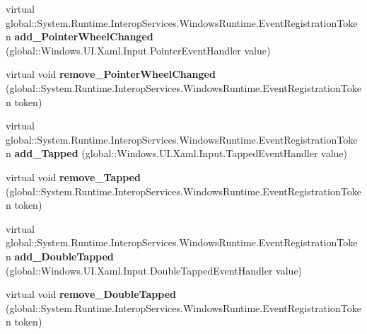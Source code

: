 \begin{DoxyCompactItemize}
\mbox{\label{class_windows_1_1_u_i_1_1_xaml_1_1_u_i_element_a789daf5519a2893ca5d46308010e2bae}} 
virtual global\+::\+System.\+Runtime.\+Interop\+Services.\+Windows\+Runtime.\+Event\+Registration\+Token {\bfseries add\+\_\+\+Pointer\+Wheel\+Changed} (global\+::\+Windows.\+U\+I.\+Xaml.\+Input.\+Pointer\+Event\+Handler value)
\item 
\mbox{\label{class_windows_1_1_u_i_1_1_xaml_1_1_u_i_element_ac3ff4695ca9eb06d618cbf67509cf594}} 
virtual void {\bfseries remove\+\_\+\+Pointer\+Wheel\+Changed} (global\+::\+System.\+Runtime.\+Interop\+Services.\+Windows\+Runtime.\+Event\+Registration\+Token token)
\item 
\mbox{\label{class_windows_1_1_u_i_1_1_xaml_1_1_u_i_element_a424707fb793f3cb0d3d9c1a1d642c7e1}} 
virtual global\+::\+System.\+Runtime.\+Interop\+Services.\+Windows\+Runtime.\+Event\+Registration\+Token {\bfseries add\+\_\+\+Tapped} (global\+::\+Windows.\+U\+I.\+Xaml.\+Input.\+Tapped\+Event\+Handler value)
\item 
\mbox{\label{class_windows_1_1_u_i_1_1_xaml_1_1_u_i_element_a2e2bb189943aceb74962211a295014c7}} 
virtual void {\bfseries remove\+\_\+\+Tapped} (global\+::\+System.\+Runtime.\+Interop\+Services.\+Windows\+Runtime.\+Event\+Registration\+Token token)
\item 
\mbox{\label{class_windows_1_1_u_i_1_1_xaml_1_1_u_i_element_a5dae62e559d69ce1b422ccd06618f671}} 
virtual global\+::\+System.\+Runtime.\+Interop\+Services.\+Windows\+Runtime.\+Event\+Registration\+Token {\bfseries add\+\_\+\+Double\+Tapped} (global\+::\+Windows.\+U\+I.\+Xaml.\+Input.\+Double\+Tapped\+Event\+Handler value)
\item 
\mbox{\label{class_windows_1_1_u_i_1_1_xaml_1_1_u_i_element_a943e8ea205e8d92b950867b58c4406d7}} 
virtual void {\bfseries remove\+\_\+\+Double\+Tapped} (global\+::\+System.\+Runtime.\+Interop\+Services.\+Windows\+Runtime.\+Event\+Registration\+Token token)
\item 
\mbox{\label{class_windows_1_1_u_i_1_1_xaml_1_1_u_i_element_a4bbe62d6b5ea9aa8d3c4d53f196cc796}} 

\end{DoxyCompactItemize}
